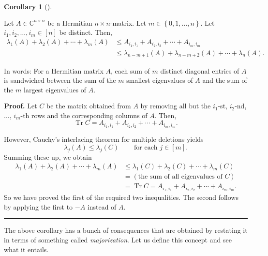 \documentclass[numbers=enddot,12pt,final,onecolumn,notitlepage]{scrartcl}%
\numberwithin{exer}{subsection}
\theoremstyle{definition}
\newtheorem{coro}[theo]{Corollary}
\newenvironment{corollary}[1][]
{\begin{coro}[#1]\begin{leftbar}}
{\end{leftbar}\end{coro}}
\newenvironment{proof}[1][Proof]{\noindent\textbf{#1.} }{\ \rule{0.5em}{0.5em}}
\begin{document}
\begin{corollary}
\label{cor.interlacing.maj-1}Let $A\in\mathbb{C}^{n\times n}$ be a Hermitian
$n\times n$-matrix. Let $m\in\left\{  0,1,\ldots,n\right\}  $. Let
$i_{1},i_{2},\ldots,i_{m}\in\left[  n\right]  $ be distinct. Then,%
\begin{align*}
\lambda_{1}\left(  A\right)  +\lambda_{2}\left(  A\right)  +\cdots+\lambda
_{m}\left(  A\right)   &  \leq A_{i_{1},i_{1}}+A_{i_{2},i_{2}}+\cdots
+A_{i_{m},i_{m}}\\
&  \leq\lambda_{n-m+1}\left(  A\right)  +\lambda_{n-m+2}\left(  A\right)
+\cdots+\lambda_{n}\left(  A\right)  .
\end{align*}

\end{corollary}

In words: For a Hermitian matrix $A$, each sum of $m$ distinct diagonal
entries of $A$ is sandwiched between the sum of the $m$ smallest eigenvalues
of $A$ and the sum of the $m$ largest eigenvalues of $A$.

\begin{proof}
Let $C$ be the matrix obtained from $A$ by removing all but the $i_{1}$-st,
$i_{2}$-nd, $\ldots$, $i_{m}$-th rows and the corresponding columns of $A$.
Then,%
\[
\operatorname*{Tr}C=A_{i_{1},i_{1}}+A_{i_{2},i_{2}}+\cdots+A_{i_{m},i_{m}}.
\]


However, Cauchy's interlacing theorem for multiple deletions yields%
\[
\lambda_{j}\left(  A\right)  \leq\lambda_{j}\left(  C\right)
\ \ \ \ \ \ \ \ \ \ \text{for each }j\in\left[  m\right]  .
\]
Summing these up, we obtain%
\begin{align*}
\lambda_{1}\left(  A\right)  +\lambda_{2}\left(  A\right)  +\cdots+\lambda
_{m}\left(  A\right)   &  \leq\lambda_{1}\left(  C\right)  +\lambda_{2}\left(
C\right)  +\cdots+\lambda_{m}\left(  C\right) \\
&  =\left(  \text{the sum of all eigenvalues of }C\right) \\
&  =\operatorname*{Tr}C=A_{i_{1},i_{1}}+A_{i_{2},i_{2}}+\cdots+A_{i_{m},i_{m}%
}.
\end{align*}
So we have proved the first of the required two inequalities. The second
follows by applying the first to $-A$ instead of $A$.
\end{proof}

The above corollary has a bunch of consequences that are obtained by restating
it in terms of something called \emph{majorization}. Let us define this
concept and see what it entails.
\end{document}
